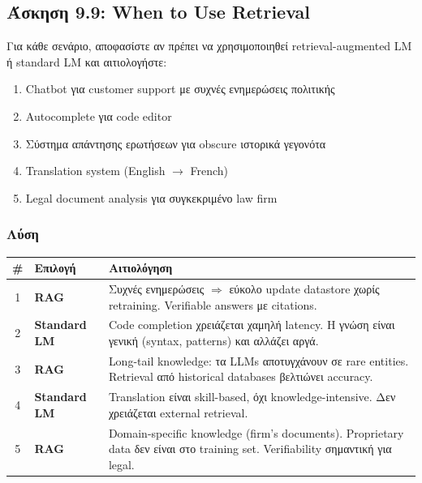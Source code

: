 \subsection{Άσκηση 9.9: When to Use Retrieval}

\begin{formulabox}[Εκφώνηση]
Για κάθε σενάριο, αποφασίστε αν πρέπει να χρησιμοποιηθεί retrieval-augmented LM ή
standard LM και αιτιολογήστε:

\begin{enumerate}
    \item Chatbot για customer support με συχνές ενημερώσεις πολιτικής
    \item Autocomplete για code editor
    \item Σύστημα απάντησης ερωτήσεων για obscure ιστορικά γεγονότα
    \item Translation system (English $\to$ French)
    \item Legal document analysis για συγκεκριμένο law firm
\end{enumerate}
\end{formulabox}

\subsubsection*{Λύση}

\begin{center}
\begin{tabular}{clp{7cm}}
\toprule
\textbf{\#} & \textbf{Επιλογή} & \textbf{Αιτιολόγηση} \\
\midrule
1 & \textbf{RAG} &
Συχνές ενημερώσεις $\Rightarrow$ εύκολο update datastore χωρίς retraining.
Verifiable answers με citations. \\

2 & \textbf{Standard LM} &
Code completion χρειάζεται χαμηλή latency. Η γνώση είναι γενική
(syntax, patterns) και αλλάζει αργά. \\

3 & \textbf{RAG} &
Long-tail knowledge: τα LLMs αποτυγχάνουν σε rare entities.
Retrieval από historical databases βελτιώνει accuracy. \\

4 & \textbf{Standard LM} &
Translation είναι skill-based, όχι knowledge-intensive.
Δεν χρειάζεται external retrieval. \\

5 & \textbf{RAG} &
Domain-specific knowledge (firm's documents).
Proprietary data δεν είναι στο training set.
Verifiability σημαντική για legal. \\
\bottomrule
\end{tabular}
\end{center}

